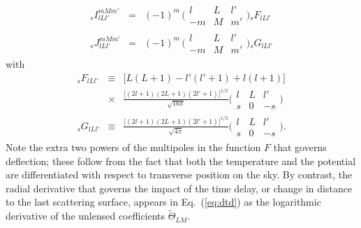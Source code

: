 \documentclass[prl,amsmath,amssymb,floatfix,superscriptaddress,nofootinbib,twocolumn]{revtex4-1}
\def\bea{\begin{eqnarray}}
\def\eea{\end{eqnarray}}
\newcommand{\ec}[1]{Eq.~(\ref{eq:#1})}
\newcommand{\eql}[1]{\label{eq:#1}}
\newcommand{\scott}[1]{{\color{darkgreen} SD: #1}}
\newcommand{\wh}[1]{{\color{red} WH: #1}}
\begin{document}
\bea
{}_{s}I_{lLl'}^{mMm'}  &=& (-1)^m\,
\bigl(\begin{smallmatrix} l & L & l' \\ -m & M & m'  \end{smallmatrix}\bigr) {}_{s}F_{lLl'} \\
{}_{s}J_{lLl'}^{mMm'}  &=& (-1)^m\,
\bigl(\begin{smallmatrix} l & L & l' \\ -m & M & m'  \end{smallmatrix}\bigr) {}_{s}G_{lLl'}
\eea
%
%
with
\bea
{}_{s}F_{lLl'} &\equiv& \big[L(L+1)-l'(l'+1)+l(l+1)\big]\nonumber  \\& \times& \frac{\big[ (2l+1)(2L+1)(2l'+1)\big]^{1/2} }{\sqrt{16 \pi}} \bigl(\begin{smallmatrix} l & L & l' \\ s & 0 & -s  \end{smallmatrix}\bigr) \\
{}_{s}G_{lLl'} &\equiv& \frac{\big[ (2l+1)(2L+1)(2l'+1)\big]^{1/2} }{\sqrt{4 \pi}} \bigl(\begin{smallmatrix} l & L & l' \\ s & 0 & -s  \end{smallmatrix}\bigr)\eql{fg}
.\eea
Note the extra two powers of the multipoles in the function $F$ that governs deflection; these follow from the fact that both the temperature and the potential are differentiated with respect to transverse position on the sky. By contrast, the radial derivative that governs the impact of the time delay, or change in distance to the last scattering surface, appears in \ec{dtd} as the logarithmic derivative of the unlensed coefficients $\tilde\Theta_{LM}$.
\end{document}
